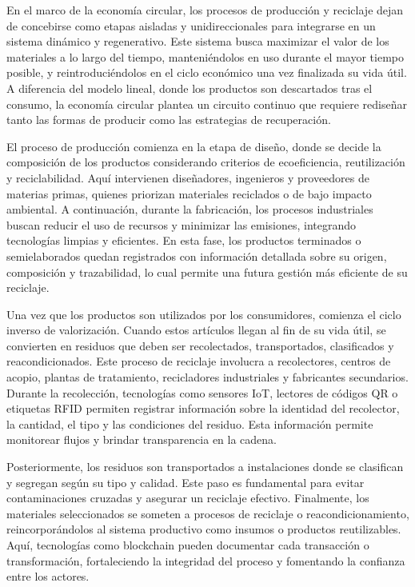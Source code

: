 En el marco de la economía circular, los procesos de producción y reciclaje dejan de concebirse como etapas aisladas y unidireccionales para integrarse en un sistema dinámico y regenerativo. Este sistema busca maximizar el valor de los materiales a lo largo del tiempo, manteniéndolos en uso durante el mayor tiempo posible, y reintroduciéndolos en el ciclo económico una vez finalizada su vida útil. A diferencia del modelo lineal, donde los productos son descartados tras el consumo, la economía circular plantea un circuito continuo que requiere rediseñar tanto las formas de producir como las estrategias de recuperación.

El proceso de producción comienza en la etapa de diseño, donde se decide la composición de los productos considerando criterios de ecoeficiencia, reutilización y reciclabilidad. Aquí intervienen diseñadores, ingenieros y proveedores de materias primas, quienes priorizan materiales reciclados o de bajo impacto ambiental. A continuación, durante la fabricación, los procesos industriales buscan reducir el uso de recursos y minimizar las emisiones, integrando tecnologías limpias y eficientes. En esta fase, los productos terminados o semielaborados quedan registrados con información detallada sobre su origen, composición y trazabilidad, lo cual permite una futura gestión más eficiente de su reciclaje.

Una vez que los productos son utilizados por los consumidores, comienza el ciclo inverso de valorización. Cuando estos artículos llegan al fin de su vida útil, se convierten en residuos que deben ser recolectados, transportados, clasificados y reacondicionados. Este proceso de reciclaje involucra a recolectores, centros de acopio, plantas de tratamiento, recicladores industriales y fabricantes secundarios. Durante la recolección, tecnologías como sensores IoT, lectores de códigos QR o etiquetas RFID permiten registrar información sobre la identidad del recolector, la cantidad, el tipo y las condiciones del residuo. Esta información permite monitorear flujos y brindar transparencia en la cadena.

Posteriormente, los residuos son transportados a instalaciones donde se clasifican y segregan según su tipo y calidad. Este paso es fundamental para evitar contaminaciones cruzadas y asegurar un reciclaje efectivo. Finalmente, los materiales seleccionados se someten a procesos de reciclaje o reacondicionamiento, reincorporándolos al sistema productivo como insumos o productos reutilizables. Aquí, tecnologías como blockchain pueden documentar cada transacción o transformación, fortaleciendo la integridad del proceso y fomentando la confianza entre los actores.

